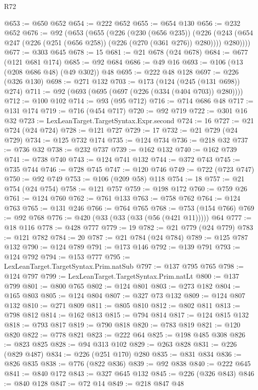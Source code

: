 \begin{lexlean}{R72}
\begin{coremodule}
@653 := @650 @652
@654 := @222 @652
@655 := @654 @130
@656 := @232 @652
@676 := @92
    (@653
      (@655
        (@226
          (@230 (@656 @235))
          (@226 (@243 (@654 @247 (@226 (@251 (@656 @258)) (@226 (@270 (@361 @276)) @280)))) @280))))
@677 := @303 @645
@678 := 15
@681 := @21 @678 (@24 @678)
@684 := @677 (@121 @681 @174)
@685 := @92 @684
@686 := @49 @16
@693 := @106 (@13 (@208 @686 @48) (@49 @302)) @48
@695 := @222 @48 @128
@697 := @226 (@326 @130)
@698 := @271 @132
@703 := @173 (@124 (@245 (@131 @698)) @274)
@711 := @92 (@693 (@695 (@697 (@226 (@334 (@404 @703)) @280))))
@712 := @100 @102
@714 := @93 (@95 @712)
@716 := @714 @686 @48
@717 := @131 @174
@719 := @716 (@454 @717)
@720 := @92 @719
@722 := @301 @16 @32
@723 := LexLeanTarget.TargetSyntax.Expr.second
@724 := 16
@727 := @21 @724 (@24 @724)
@728 := @121 @727
@729 := 17
@732 := @21 @729 (@24 @729)
@734 := @125 @732 @174
@735 := @124 @734
@736 := @218 @32
@737 := @736 @32
@738 := @232 @737
@739 := @162 @132
@740 := @162 @739
@741 := @738 @740
@743 := @124 @741 @132
@744 := @372 @743
@745 := @735 @744
@746 := @728 @745
@747 := @120 @746
@749 := @722 (@723 @747)
@750 := @92 @749
@753 := @106 (@209 @58) @118
@754 := 18
@757 := @21 @754 (@24 @754)
@758 := @121 @757
@759 := @198 @172
@760 := @759 @26
@761 := @124 @760
@762 := @761 @133
@763 := @758 @762
@764 := @124 @763
@765 := @131 @246
@766 := @764 @765
@768 := @753 (@154 @766)
@769 := @92 @768
@776 := @420 (@33 (@33 (@33 (@56 (@421 @11))))) @64
@777 := @18 @116
@778 := @428 @777
@779 := 19
@782 := @21 @779 (@24 @779)
@783 := @121 @782
@784 := 20
@787 := @21 @784 (@24 @784)
@789 := @125 @787 @132
@790 := @124 @789
@791 := @173 @146
@792 := @139 @791
@793 := @124 @792
@794 := @153 @777
@795 := LexLeanTarget.TargetSyntax.Prim.natSub
@797 := @137 @795 @765
@798 := @124 @797
@799 := LexLeanTarget.TargetSyntax.Prim.natLt
@800 := @137 @799
@801 := @800 @765
@802 := @124 @801
@803 := @273 @182
@804 := @165 @803
@805 := @124 @804
@807 := @327 @73 @132
@809 := @124 @807 @132
@810 := @271 @809
@811 := @805 @810
@812 := @802 @811
@813 := @798 @812
@814 := @162 @813
@815 := @794 @814
@817 := @124 @815 @132
@818 := @793 @817
@819 := @790 @818
@820 := @783 @819
@821 := @120 @820
@822 := @778 @821
@823 := @222 @64
@825 := @198 @485 @308
@826 := @823 @825
@828 := @94 @313 @102
@829 := @263 @828
@831 := @226 (@829 @487)
@834 := @226 (@251 @170) @280
@835 := @831 @834
@836 := @826 @835
@838 := @776 (@822 @836)
@839 := @92 @838
@840 := @222 @645
@841 := @840 @172
@843 := @327 @645 @132
@845 := @226 (@326 @843)
@846 := @840 @128
@847 := @72 @14
@849 := @218 @847 @48

\end{coremodule}
\end{lexlean}
